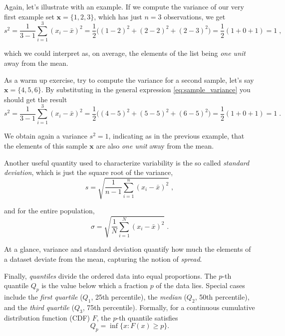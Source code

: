 \documentclass{book}
\begin{document}
\medskip

Again, let's illustrate with an example. If we compute the variance of our very first example set $\textbf{x} = \{1, 2, 3\}$, which has just $n = 3$ observations, we get
\begin{equation}
	s^2 = \frac{1}{3 - 1} \sum_{i = 1}^{3} (x_{i} - \bar{x})^{2} = \frac{1}{2} \big((1 - 2)^{2} + (2 - 2)^{2} + (2 - 3)^{2}\big) = \frac{1}{2} (1 + 0 + 1) = 1 \; , \nonumber
\end{equation}

which we could interpret as, on average, the elements of the list being \textit{one unit} away from the mean. 

\medskip

As a warm up exercise, try to compute the variance for a second sample, let's say $\textbf{x} = \{4, 5, 6\}$. By substituting in the general expression \eqref{eq:sample_variance} you should get the result
\begin{equation}
	s^2 = \frac{1}{3 - 1} \sum_{i = 1}^{3} (x_{i} - \bar{x})^{2} = \frac{1}{2} \big((4 - 5)^{2} + (5 - 5)^{2} + (6 - 5)^{2}\big) = \frac{1}{2} (1 + 0 + 1) = 1 \; . \nonumber
\end{equation}

We obtain again a variance $s^2 = 1$, indicating as in the previous example, that the elements of this sample $\textbf{x}$ are also \textit{one unit} away from the mean.

\medskip

Another useful quantity used to characterize variability is the so called \textit{standard deviation}, which is just the square root of the variance,
\begin{equation}
	s = \sqrt{\frac{1}{n - 1} \sum_{i = 1}^{n} (x_{i} - \bar{x})^{2}} \; ,
	\label{eq:sample_std}
\end{equation}

and for the entire population,
\begin{equation}
	\sigma = \sqrt{\frac{1}{N } \sum_{i = 1}^{N} (x_{i} - \bar{x})^{2}} \; .
	\label{eq:population_std} 
\end{equation}

At a glance, variance and standard deviation quantify how much the elements of a dataset deviate from the mean, capturing the notion of \textit{spread}.

\medskip

Finally, \textit{quantiles} divide the ordered data into equal proportions. The $p$-th quantile $Q_p$ is the value below which a fraction $p$ of the data lies. Special cases include the \textit{first quartile} ($Q_1$, 25th percentile), the \textit{median} ($Q_2$, 50th percentile), and the \textit{third quartile} ($Q_3$, 75th percentile). Formally, for a continuous cumulative distribution function (CDF) $F$, the $p$-th quantile satisfies
\begin{equation}
	Q_p = \inf \{ x : F(x) \ge p \}.
	\label{eq:quantiles}
\end{equation}
\end{document}
